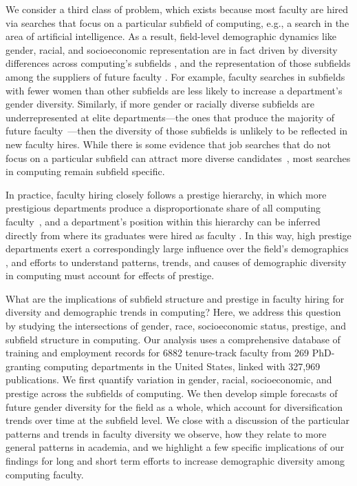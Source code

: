 \documentclass[reprint, twocolumn, aps, nofootinbib, superscriptaddress, longbibliography]{revtex4-1}
\begin{document}
We consider a third class of problem, which exists because most faculty are hired via searches that focus on a particular subfield of computing, e.g., a search in the area of artificial intelligence. As a result, field-level demographic dynamics like gender, racial, and socioeconomic representation are in fact driven by diversity differences across computing's subfields \cite{expanding2019bizot}, and the representation of those subfields among the suppliers of future faculty \cite{clauset2015systematic}. For example, faculty searches in subfields with fewer women than other subfields are less likely to increase a department's gender diversity. Similarly, if more gender or racially diverse subfields are underrepresented at elite departments---the ones that produce the majority of future faculty~\cite{clauset2015systematic}---then the diversity of those subfields is unlikely to be reflected in new faculty hires. While there is some evidence that job searches that do not focus on a particular subfield can attract more diverse candidates~\cite{carlson2021toward, mervis2020cluster}, most searches in computing remain subfield specific. 

In practice, faculty hiring closely follows a prestige hierarchy, in which more prestigious departments produce a disproportionate share of all computing faculty~\cite{clauset2015systematic}, and a department's position within this hierarchy can be inferred directly from where its graduates were hired as faculty \cite{clauset2015systematic, de2018physical}. In this way, high prestige departments exert a correspondingly large influence over the field's demographics \cite{way2016gender}, and efforts to understand patterns, trends, and causes of demographic diversity in computing must account for effects of prestige. 

What are the implications of subfield structure and prestige in faculty hiring for diversity and demographic trends in computing? Here, we address this question by studying the intersections of gender, race, socioeconomic status, prestige, and subfield structure in computing. Our analysis uses a comprehensive database of training and employment records for 6882 tenure-track faculty from 269 PhD-granting computing departments in the United States, linked with 327,969 publications. We first quantify variation in gender, racial, socioeconomic, and prestige across the subfields of computing. We then develop simple forecasts of future gender diversity for the field as a whole, which account for diversification trends over time at the subfield level. We close with a discussion of the particular patterns and trends in faculty diversity we observe, how they relate to more general patterns in academia, and we highlight a few specific implications of our findings for long and short term efforts to increase demographic diversity among computing faculty. 
\end{document}
